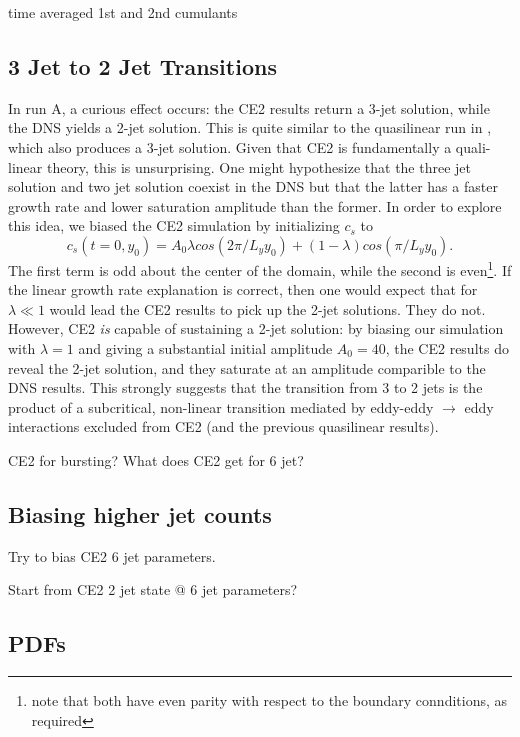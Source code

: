 \documentclass{jfm}
\begin{document}
time averaged 1st and 2nd cumulants

\subsection{3 Jet to 2 Jet Transitions}
\label{sec:3->2}

In run A, a curious effect occurs: the CE2 results return a 3-jet solution, while the DNS yields a 2-jet solution.
This is quite similar to the quasilinear run in \citet{2018RSPSA.47480422T}, which also produces a 3-jet solution.
Given that CE2 is fundamentally a quali-linear theory, this is unsurprising.
One might hypothesize that the three jet solution and two jet solution coexist in the DNS but that the latter has a faster growth rate and lower saturation amplitude than the former.
In order to explore this idea, we biased the CE2 simulation by initializing $c_s$ to
\begin{equation}
  \label{eq:bias}
  c_s(t=0, y_0) = A_0 \lambda cos(2\pi/L_y y_0) + (1-\lambda) cos (\pi/L_y y_0).
\end{equation}
The first term is odd about the center of the domain, while the second is even\footnote{note that both have even parity with respect to the boundary connditions, as required}.
If the linear growth rate explanation is correct, then one would expect that for $\lambda \ll 1$ would lead the CE2 results to pick up the 2-jet solutions.
They do not.
However, CE2 \emph{is} capable of sustaining a 2-jet solution:
by biasing our simulation with $\lambda = 1$ and giving a substantial initial amplitude $A_0 = 40$, the CE2 results do reveal the 2-jet solution, and they saturate at an amplitude comparible to the DNS results.
This strongly suggests that the transition from 3 to 2 jets is the product of a subcritical, non-linear transition mediated by eddy-eddy $\to$ eddy interactions excluded from CE2 (and the previous quasilinear results).



CE2 for bursting?
What does CE2 get for 6 jet?

\subsection{Biasing higher jet counts}
\label{sec:higher_jet}

Try to bias CE2 6 jet parameters.

Start from CE2 2 jet state @ 6 jet parameters?

\subsection{PDFs}
\label{sec:pdf}
\end{document}
